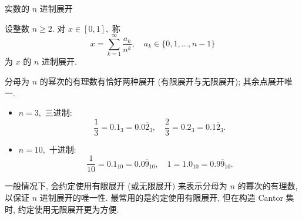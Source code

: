 \begin{frame}{实数的 $n$ 进制展开}

\begin{Def}[$n$ 进制展开]
设整数 $n \geqslant 2.$ 对 $x \in [0,1],$ 称
\[
x = \sum_{k=1}^{\infty} \frac{a_k}{n^k}, \quad a_k \in \{0, 1, \ldots, n-1\}
\]
为 $x$ 的 \alert{$n$ 进制展开}.
\end{Def}

\pause

\begin{attnblock}[$n$ 进制展开的非唯一性]
分母为 $n$ 的幂次的有理数有恰好两种展开 (有限展开与无限展开); 其余点展开唯一.
\end{attnblock}

\pause

\begin{eg}
\begin{itemize}
\item $n = 3,$ 三进制:
\[
\dfrac{1}{3} = 0.1_3 = 0.0\overline{2}_3, \quad \dfrac{2}{3} = 0.2_3 = 0.1\overline{2}_3.
\]
\item $n = 10,$ 十进制:
\[
\dfrac{1}{10} = 0.1_{10} = 0.0\overline{9}_{10}, \quad 1 = 1.0_{10} = 0.9\overline{9}_{10}.
\]
\end{itemize}
\end{eg}

\pause
\vspace{0.5em}

一般情况下, 会约定使用有限展开 (或无限展开) 来表示分母为 $n$ 的幂次的有理数, 以保证 $n$ 进制展开的唯一性.
最常用的是约定使用有限展开, 但在构造 Cantor 集时, 约定使用无限展开更为方便.

\end{frame}


